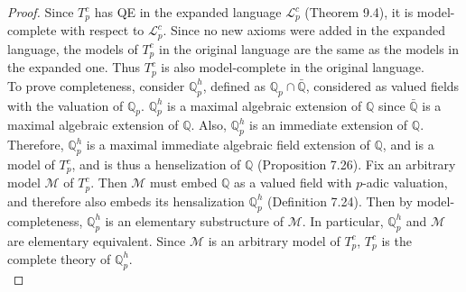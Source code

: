 \documentclass{article}
\begin{document}
  \begin{proof}
    Since $T_p^c$ has QE in the expanded language $\mathcal{L}_p^c$
    (Theorem 9.4), it is model-complete with respect to
    $\mathcal{L}_p^c$. Since no new axioms were added in the expanded
    language, the models of $T_p^c$ in the original language are the same
    as the models in the expanded one. Thus $T_p^c$ is also model-complete
    in the original language. \\

    To prove completeness, consider $\mathbb{Q}_p^h$, defined as
    $\mathbb{Q}_p\cap\bar{\mathbb{Q}}$, considered as valued fields with
    the valuation of $\mathbb{Q}_p$. $\mathbb{Q}_p^h$ is a maximal
    algebraic extension of $\mathbb{Q}$ since $\bar{\mathbb{Q}}$ is a
    maximal algebraic extension of $\mathbb{Q}$. Also, $\mathbb{Q}_p^h$ is
    an immediate extension of $\mathbb{Q}$. Therefore, $\mathbb{Q}_p^h$ is
    a maximal immediate algebraic field extension of $\mathbb{Q}$, and is a
    model of $T_p^c$, and is thus a henselization of $\mathbb{Q}$
    (Proposition 7.26). Fix an arbitrary model $\mathcal{M}$ of $T_p^c$.
    Then $\mathcal{M}$ must embed $\mathbb{Q}$ as a valued field with
    $p$-adic valuation, and therefore also embeds its hensalization
    $\mathbb{Q}_p^h$ (Definition 7.24). Then by model-completeness,
    $\mathbb{Q}_p^h$ is an elementary substructure of $\mathcal{M}$. In
    particular, $\mathbb{Q}_p^h$ and $\mathcal{M}$ are elementary
    equivalent. Since $\mathcal{M}$ is an arbitrary model of $T_p^c$,
    $T_p^c$ is the complete theory of $\mathbb{Q}_p^h$. \\
  \end{proof}
\end{document}
